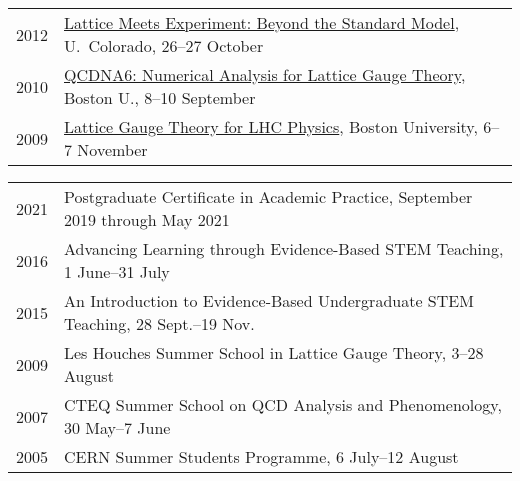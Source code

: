 \documentclass[10 pt]{article}
\renewcommand{\section}[2]%
    {\pagebreak[2]\vspace{1.3\baselineskip}%
     \hspace{0in}%
     \marginpar{
     \raggedright \scshape #1}#2}
\newcommand{\blankline}{\quad\pagebreak[2]}
\newcommand{\spacer}{\blankline\vspace{12 pt}\blankline}
\begin{document}
\begin{tabular}[t]{cl}
  2012 & \href{http://www.maths.liv.ac.uk/TheorPhys/people/staff/schaich/lat-exp-2012/}{Lattice Meets Experiment: Beyond the Standard Model}, U.~Colorado, 26--27 October            \\[6 pt]
  2010 & \href{http://www.maths.liv.ac.uk/TheorPhys/people/staff/schaich/QCDNA6/}{QCDNA6: Numerical Analysis for Lattice Gauge Theory}, Boston U., 8--10 September                   \\[6 pt]
  2009 & \href{http://www.maths.liv.ac.uk/TheorPhys/people/staff/schaich/LGTforLHC2009/}{Lattice Gauge Theory for LHC Physics}, Boston University, 6--7 November                     \\
\end{tabular}

\spacer



\section{Additional training} %

\vspace{-12 pt} %
\begin{tabular}[t]{cl}
  2021 & Postgraduate Certificate in Academic Practice, September 2019 through May 2021   \\ %
  2016 & Advancing Learning through Evidence-Based STEM Teaching, 1 June--31 July         \\ %
  2015 & An Introduction to Evidence-Based Undergraduate STEM Teaching, 28 Sept.--19 Nov. \\ %
  2009 & Les Houches Summer School in Lattice Gauge Theory, 3--28 August                  \\ %
  2007 & CTEQ Summer School on QCD Analysis and Phenomenology, 30 May--7 June             \\ %
  2005 & CERN Summer Students Programme, 6 July--12 August                                \\ %
\end{tabular}

\spacer
\end{document}
